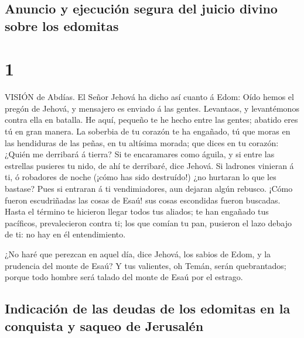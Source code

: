 \hypertarget{anuncio-y-ejecuciuxf3n-segura-del-juicio-divino-sobre-los-edomitas}{%
\subsection{Anuncio y ejecución segura del juicio divino sobre los
edomitas}\label{anuncio-y-ejecuciuxf3n-segura-del-juicio-divino-sobre-los-edomitas}}

\hypertarget{section}{%
\section{1}\label{section}}

 VISIÓN de Abdías. El Señor Jehová ha dicho así cuanto á
Edom: Oído hemos el pregón de Jehová, y mensajero es enviado á las
gentes. Levantaos, y levantémonos contra ella en batalla. 
He aquí, pequeño te he hecho entre las gentes; abatido eres tú en gran
manera.  La soberbia de tu corazón te ha engañado, tú que
moras en las hendiduras de las peñas, en tu altísima morada; que dices
en tu corazón: ¿Quién me derribará á tierra?  Si te
encaramares como águila, y si entre las estrellas pusieres tu nido, de
ahí te derribaré, dice Jehová.  Si ladrones vinieran á ti, ó
robadores de noche (¡cómo has sido destruído!) ¿no hurtaran lo que les
bastase? Pues si entraran á ti vendimiadores, aun dejaran algún rebusco.
 ¡Cómo fueron escudriñadas las cosas de Esaú! sus cosas
escondidas fueron buscadas.  Hasta el término te hicieron
llegar todos tus aliados; te han engañado tus pacíficos, prevalecieron
contra ti; los que comían tu pan, pusieron el lazo debajo de ti: no hay
en él entendimiento.

 ¿No haré que perezcan en aquel día, dice Jehová, los sabios
de Edom, y la prudencia del monte de Esaú?  Y tus valientes,
oh Temán, serán quebrantados; porque todo hombre será talado del monte
de Esaú por el estrago.

\hypertarget{indicaciuxf3n-de-las-deudas-de-los-edomitas-en-la-conquista-y-saqueo-de-jerusaluxe9n}{%
\subsection{Indicación de las deudas de los edomitas en la conquista y
saqueo de
Jerusalén}\label{indicaciuxf3n-de-las-deudas-de-los-edomitas-en-la-conquista-y-saqueo-de-jerusaluxe9n}}

